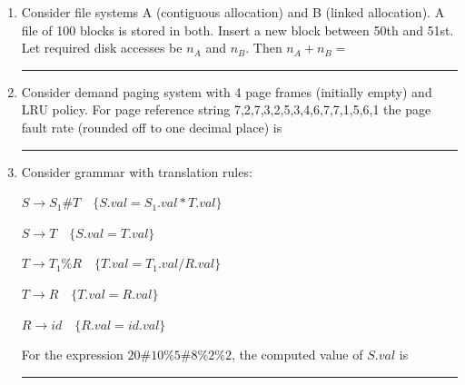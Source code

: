 \begin{enumerate}
\item Consider file systems A (contiguous allocation) and B (linked allocation). A file of 100 blocks is stored in both. Insert a new block between 50th and 51st. Let required disk accesses be $n_A$ and $n_B$. Then $n_A+n_B=$\rule{2cm}{0.4pt}  

\hfill{}

\item Consider demand paging system with 4 page frames (initially empty) and LRU policy. For page reference string 7,2,7,3,2,5,3,4,6,7,7,1,5,6,1 the page fault rate (rounded off to one decimal place) is \rule{2cm}{0.4pt}  

\hfill{}

\item Consider grammar with translation rules:  

$S \to S_1 \# T \quad \{S.val = S_1.val * T.val\}$  

$S \to T \quad \{S.val = T.val\}$  

$T \to T_1 \% R \quad \{T.val = T_1.val / R.val\}$  

$T \to R \quad \{T.val = R.val\}$  

$R \to id \quad \{R.val = id.val\}$  

For the expression $20\#10\%5\#8\%2\%2$, the computed value of $S.val$ is \rule{2cm}{0.4pt}  

\hfill{}



\end{enumerate}
